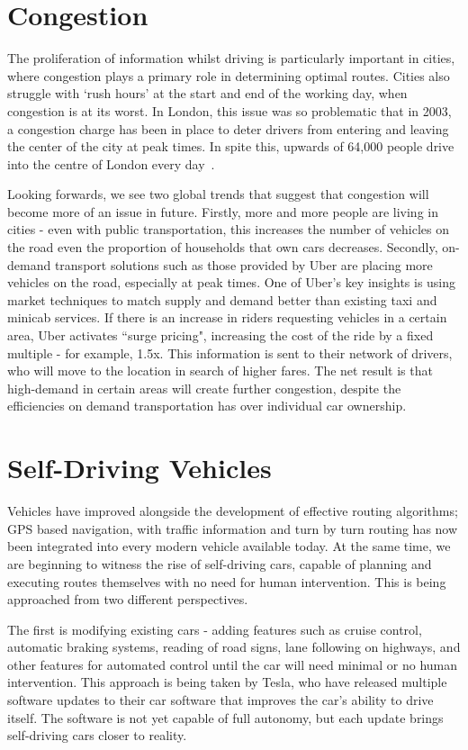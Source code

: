\documentclass[ %
                    author={Alexander Hill},
                supervisor={Dr. Benjamin Sach},
                    degree={MEng},
                     title={MARMOSET},
                  subtitle={Multi-Agent Route Management using Online Simulation for Efficient Transportation},
                      type={research},
                      year={2016} ]{dissertation}
\begin{document}
\section{Congestion}

The proliferation of information whilst driving is particularly important in
cities, where congestion plays a primary role in determining optimal routes.
Cities also struggle with `rush hours' at the start and end of the working day,
when congestion is at its worst. In London, this issue was so problematic that
in 2003, a congestion charge has been in place to deter drivers from entering
and leaving the center of the city at peak times. In spite this, upwards of
64,000 people drive into the centre of London every day~\cite{tfl}.

Looking forwards, we see two global trends that suggest that congestion will
become more of an issue in future. Firstly, more and more people are living in
cities - even with public transportation, this increases the number of vehicles
on the road even the proportion of households that own cars decreases. Secondly,
on-demand transport solutions such as those provided by Uber are placing more
vehicles on the road, especially at peak times. One of Uber's key insights is
using market techniques to match supply and demand better than existing taxi and
minicab services. If there is an increase in riders requesting vehicles in a
certain area, Uber activates ``surge pricing", increasing the cost of the ride
by a fixed multiple - for example, 1.5x. This information is sent to their
network of drivers, who will move to the location in search of higher fares. The
net result is that high-demand in certain areas will create further congestion,
despite the efficiencies on demand transportation has over individual car
ownership.

\section{Self-Driving Vehicles}

Vehicles have improved alongside the development of effective routing
algorithms; GPS based navigation, with traffic information and turn by turn
routing has now been integrated into every modern vehicle available today.  At
the same time, we are beginning to witness the rise of self-driving cars,
capable of planning and executing routes themselves with no need for human
intervention. This is being approached from two different perspectives.

The first is modifying existing cars - adding features such as cruise control,
automatic braking systems, reading of road signs, lane following on highways,
and other features for automated control until the car will need minimal or no
human intervention. This approach is being taken by Tesla, who have released
multiple software updates to their car software that improves the car's ability
to drive itself. The software is not yet capable of full autonomy, but each
update brings self-driving cars closer to reality.
\end{document}

